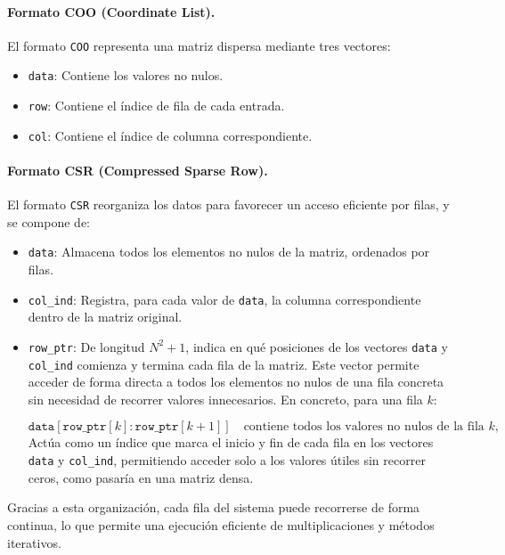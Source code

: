 \documentclass{article}
\begin{document}
\paragraph{Formato COO (Coordinate List).} 
\label{par:coo} El formato \texttt{COO} representa una matriz dispersa mediante tres vectores:
\begin{itemize}
    \item \texttt{data}: Contiene los valores no nulos.
    \item \texttt{row}: Contiene el índice de fila de cada entrada.
    \item \texttt{col}: Contiene el índice de columna correspondiente.
\end{itemize}
\paragraph{Formato CSR (Compressed Sparse Row).} El formato \texttt{CSR} reorganiza los datos para favorecer un acceso eficiente por filas, y se compone de:
\label{paragraph:csr}
\begin{itemize}
    \item \texttt{data}: Almacena todos los elementos no nulos de la matriz, ordenados por filas.
    \item \texttt{col\_ind}: Registra, para cada valor de \texttt{data}, la columna correspondiente dentro de la matriz original.
    \item \texttt{row\_ptr}: De longitud $N^2 + 1$, indica en qué posiciones de los vectores \texttt{data} y \texttt{col\_ind} comienza y termina cada fila de la matriz. Este vector permite acceder de forma directa a todos los elementos no nulos de una fila concreta sin necesidad de recorrer valores innecesarios. En concreto, para una fila $k$:

    $$
    \texttt{data}[\texttt{row\_ptr}[k] : \texttt{row\_ptr}[k+1]]
    \quad \text{contiene todos los valores no nulos de la fila } k,
    $$
    Actúa como un índice que marca el inicio y fin de cada fila en los vectores \texttt{data} y \texttt{col\_ind}, permitiendo acceder solo a los valores útiles sin recorrer ceros, como pasaría en una matriz densa.
\end{itemize}
Gracias a esta organización, cada fila del sistema puede recorrerse de forma continua, lo que permite una ejecución eficiente de multiplicaciones y métodos iterativos.
\end{document}
